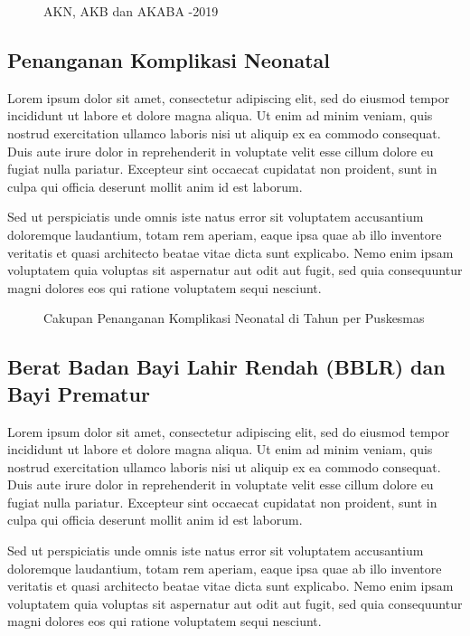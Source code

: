 \begin{figure}[H]
    \centering{}
    \caption{AKN, AKB dan AKABA -2019}
    \label{fig:AKN-AKABA-2015-2019}
\end{figure}

\subsection{Penanganan Komplikasi Neonatal}
Lorem ipsum dolor sit amet, consectetur adipiscing elit, sed do eiusmod tempor incididunt ut labore et dolore magna aliqua. Ut enim ad minim veniam, quis nostrud exercitation ullamco laboris nisi ut aliquip ex ea commodo consequat. Duis aute irure dolor in reprehenderit in voluptate velit esse cillum dolore eu fugiat nulla pariatur. Excepteur sint occaecat cupidatat non proident, sunt in culpa qui officia deserunt mollit anim id est laborum.

Sed ut perspiciatis unde omnis iste natus error sit voluptatem accusantium doloremque laudantium, totam rem aperiam, eaque ipsa quae ab illo inventore veritatis et quasi architecto beatae vitae dicta sunt explicabo. Nemo enim ipsam voluptatem quia voluptas sit aspernatur aut odit aut fugit, sed quia consequuntur magni dolores eos qui ratione voluptatem sequi nesciunt.

\begin{figure}[H]
    \centering
    \caption{Cakupan Penanganan Komplikasi Neonatal di \namaKabupaten Tahun \tP per Puskesmas}
    \label{fig:Pelayanan-Komplikasi-Neonatal}
\end{figure}


\subsection{Berat Badan Bayi Lahir Rendah (BBLR) dan Bayi Prematur}
Lorem ipsum dolor sit amet, consectetur adipiscing elit, sed do eiusmod tempor incididunt ut labore et dolore magna aliqua. Ut enim ad minim veniam, quis nostrud exercitation ullamco laboris nisi ut aliquip ex ea commodo consequat. Duis aute irure dolor in reprehenderit in voluptate velit esse cillum dolore eu fugiat nulla pariatur. Excepteur sint occaecat cupidatat non proident, sunt in culpa qui officia deserunt mollit anim id est laborum.

Sed ut perspiciatis unde omnis iste natus error sit voluptatem accusantium doloremque laudantium, totam rem aperiam, eaque ipsa quae ab illo inventore veritatis et quasi architecto beatae vitae dicta sunt explicabo. Nemo enim ipsam voluptatem quia voluptas sit aspernatur aut odit aut fugit, sed quia consequuntur magni dolores eos qui ratione voluptatem sequi nesciunt.


